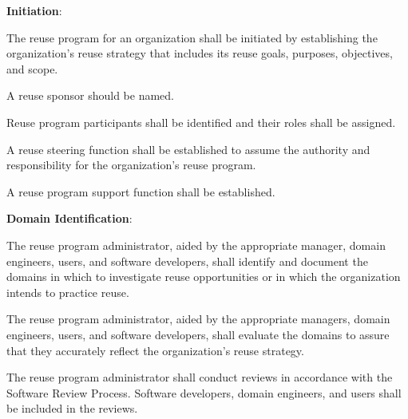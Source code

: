 			\begin{adjustwidth}{2em}{0pt} 

				\begin{compactenum}

					\item {\bf Initiation}:

					\begin{compactenum}

						\item The reuse program for an organization shall be initiated by establishing the organization’s reuse strategy that includes its reuse goals, purposes, objectives, and scope.

						\item A reuse sponsor should be named.

						\item Reuse program participants shall be identified and their roles shall be assigned.

						\item A reuse steering function shall be established to assume the authority and responsibility for the organization’s reuse program.

						\item A reuse program support function shall be established.

					\end{compactenum}

					\item {\bf Domain Identification}:

					\begin{compactenum}

						\item The reuse program administrator, aided by the appropriate manager, domain engineers, users, and software developers, shall identify and document the domains in which to investigate reuse opportunities or in which the organization intends to practice reuse.

						\item The reuse program administrator, aided by the appropriate managers, domain engineers, users, and software developers, shall evaluate the domains to assure that they accurately reflect the organization’s reuse strategy.

						\item The reuse program administrator shall conduct reviews in accordance with the Software Review Process. Software developers, domain engineers, and users shall be included in the reviews.


\end{compactenum}
\end{compactenum}
\end{adjustwidth}
